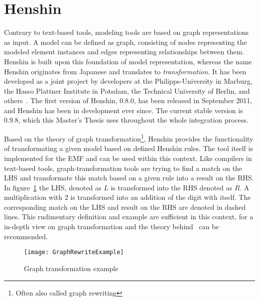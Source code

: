 \section{Henshin}\label{environment_and_tools:henshin}
Contrary to text-based tools, modeling tools are based on graph
representations as input. A model can be defined as graph, consisting
of nodes representing the modeled element instances and edges representing
relationships between them. Henshin is built upon this foundation of model representation,
whereas the name Henshin originates from Japanese and translates to
\textit{transformation}.
It has been developed as a joint project by developers at the
Philipps-University in Marburg, the Hasso Plattner Institute in Potsdam, 
the Technical University of Berlin, and others~\cite{Henshin}. The first version
of Henshin, 0.8.0, has been released in September 2011, and Henshin has been in
development ever since. The current stable version is 0.9.8, which this Master's
Thesis uses throughout the whole integration process. 

Based on the theory of graph transformation\footnote{Often also
called graph rewriting}, Henshin provides the functionality of transformating a
given model based on defined Henshin rules. The tool itself is implemented for
the \ac{EMF} and can be used within this context. Like compilers in text-based
tools, graph-transformation tools are trying to find a match on the \ac{LHS} and transformate this match
based on a given rule into a result on the \ac{RHS}. In figure~\ref{graphrewriting_example} the \ac{LHS},
denoted as $L$ is transformed into the \ac{RHS} denoted as $R$. A
multiplication with $2$ is transformed into an addition of the digit with
itself. The corresponding match on the \ac{LHS} and result on the \ac{RHS} are
denoted in dashed lines. This rudimentary definition and example are sufficient
in this context, for a in-depth view on graph transformation and the theory
behind~\cite{rozenberg1997handbook} can be recommended.

\begin{figure}%
\begin{center}
\texttt{[image: GraphRewriteExample]}\\
\end{center}
\caption{Graph transformation example~\cite{Wik13_4}}
\label{graphrewriting_example}
\end{figure}

